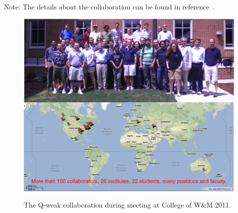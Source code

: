 Note: The details about the collaboration can be found in reference~\cite{website:qweak}.


\begin{figure}[h]
	\begin{center}
		\includegraphics[width=14.5cm]{figures/qweak_collaboration_combine}
		\label{fig:qweak_collaboration}
		\caption
		{The Q-weak collaboration during meeting at College of W\&M 2011.}
	\end{center}
\end{figure}
